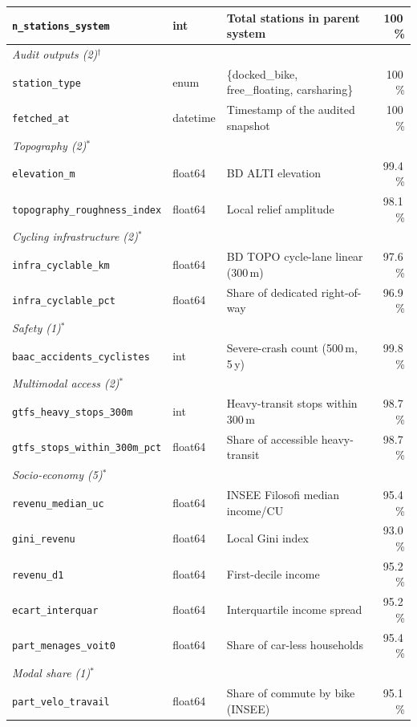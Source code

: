 \documentclass[11pt,a4paper]{article}
\begin{document}
\begin{table}[ht]
\begin{tabular}{@{}lllr@{}}
\quad\texttt{n\_stations\_system}& int     & Total stations in parent system            & 100\,\%\\
\midrule
\multicolumn{4}{l}{\textit{Audit outputs (2)$^\dag$}}\\
\quad\texttt{station\_type}      & enum    & \{docked\_bike, free\_floating, carsharing\} & 100\,\%\\
\quad\texttt{fetched\_at}        & datetime& Timestamp of the audited snapshot          & 100\,\%\\
\midrule
\multicolumn{4}{l}{\textit{Topography (2)$^\ast$}}\\
\quad\texttt{elevation\_m}                  & float64 & BD ALTI elevation                & 99.4\,\%\\
\quad\texttt{topography\_roughness\_index}  & float64 & Local relief amplitude           & 98.1\,\%\\
\midrule
\multicolumn{4}{l}{\textit{Cycling infrastructure (2)$^\ast$}}\\
\quad\texttt{infra\_cyclable\_km}           & float64 & BD TOPO cycle-lane linear (300\,m) & 97.6\,\%\\
\quad\texttt{infra\_cyclable\_pct}          & float64 & Share of dedicated right-of-way  & 96.9\,\%\\
\midrule
\multicolumn{4}{l}{\textit{Safety (1)$^\ast$}}\\
\quad\texttt{baac\_accidents\_cyclistes}    & int     & Severe-crash count (500\,m, 5\,y)  & 99.8\,\%\\
\midrule
\multicolumn{4}{l}{\textit{Multimodal access (2)$^\ast$}}\\
\quad\texttt{gtfs\_heavy\_stops\_300m}      & int     & Heavy-transit stops within 300\,m   & 98.7\,\%\\
\quad\texttt{gtfs\_stops\_within\_300m\_pct}& float64 & Share of accessible heavy-transit  & 98.7\,\%\\
\midrule
\multicolumn{4}{l}{\textit{Socio-economy (5)$^\ast$}}\\
\quad\texttt{revenu\_median\_uc}            & float64 & INSEE Filosofi median income/CU     & 95.4\,\%\\
\quad\texttt{gini\_revenu}                  & float64 & Local Gini index                    & 93.0\,\%\\
\quad\texttt{revenu\_d1}                    & float64 & First-decile income                 & 95.2\,\%\\
\quad\texttt{ecart\_interquar}              & float64 & Interquartile income spread         & 95.2\,\%\\
\quad\texttt{part\_menages\_voit0}          & float64 & Share of car-less households        & 95.4\,\%\\
\midrule
\multicolumn{4}{l}{\textit{Modal share (1)$^\ast$}}\\
\quad\texttt{part\_velo\_travail}           & float64 & Share of commute by bike (INSEE)    & 95.1\,\%\\
\bottomrule
\end{tabular}
\end{table}
\end{document}
